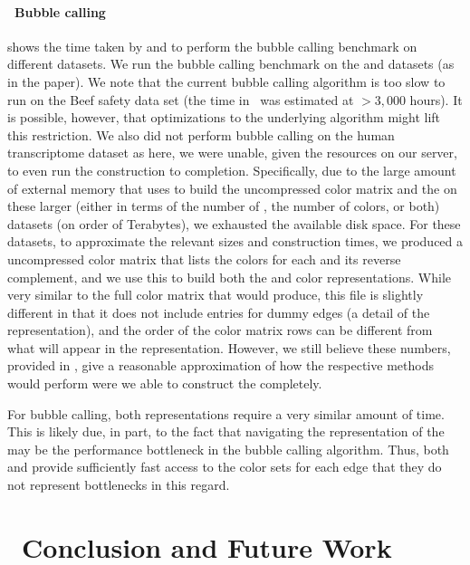 \paragraph*{~Bubble calling}  shows the time taken by \system and \vari to perform the bubble
calling benchmark on different datasets. We run the bubble calling benchmark on
the \ecoli and \plant datasets (as in the \vari paper). We note that the current
bubble calling algorithm is too slow to run on the Beef safety data set (the
time in~\cite{MuggliBoNo17} was estimated at $>3,000$ hours). It is possible,
however, that optimizations to the underlying algorithm might lift this
restriction. We also did not perform bubble calling on the human transcriptome
dataset as here, we were unable, given the resources on our server, to even run
the \dbg construction to completion. Specifically, due to the large amount of
external memory that \vari uses to build the uncompressed color matrix and the
\dbg on these larger (either in terms of the number of \kmers, the number of
colors, or both) datasets (on order of Terabytes), we exhausted the available
disk space. For these datasets, to approximate the relevant sizes and
construction times, we produced a uncompressed color matrix that lists the
colors for each \kmer and its reverse complement, and we use this to build both
the \vari and \system color representations. While very similar to the full color
matrix that \vari would produce, this file is slightly different in that it does
not include entries for dummy edges (a detail of the \boss representation), and
the order of the color matrix rows can be different from what will appear in the
\boss representation. However, we still believe these numbers, provided in
, give a reasonable approximation of how the respective
methods would perform were we able to construct the \dbg completely.

For bubble calling, both representations require a very similar amount of time.
This is likely due, in part, to the fact that navigating the \boss
representation of the \dbg may be the performance bottleneck in the bubble
calling algorithm. Thus, both \vari and \system provide sufficiently fast access
to the color sets for each edge that they do not represent bottlenecks in this
regard.

\section{~Conclusion and Future Work}
\label{sec:conclusion}

